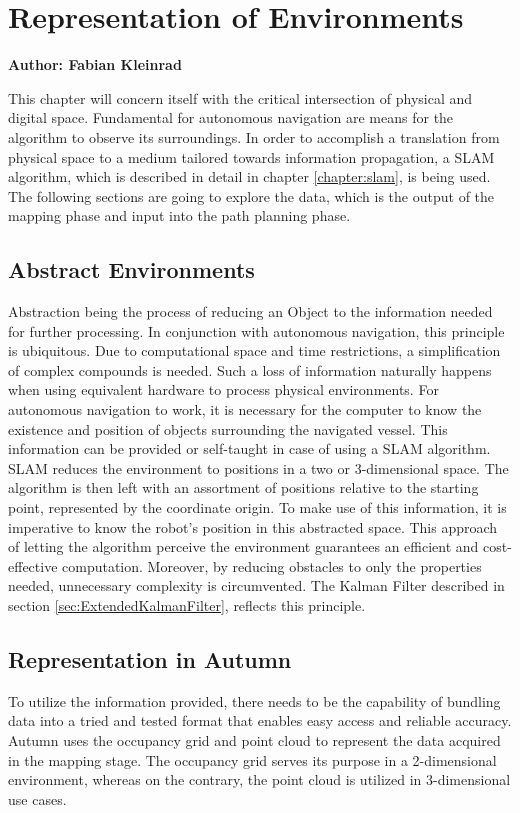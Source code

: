 \chapter{Representation of Environments}
\label{chapter:abstract_env}

\textbf{Author: Fabian Kleinrad} 

This chapter will concern itself with the critical intersection of physical and digital space. Fundamental for autonomous navigation are means for the algorithm to observe its surroundings. In order to accomplish a translation from physical space to a medium tailored towards information propagation, a SLAM algorithm, which is described in detail in chapter \ref{chapter:slam}, is being used. The following sections are going to explore the data, which is the output of the mapping phase and input into the path planning phase.

\section{Abstract Environments}

Abstraction being the process of reducing an Object to the information needed for further processing. In conjunction with autonomous navigation, this principle is ubiquitous. Due to computational space and time restrictions, a simplification of complex compounds is needed. Such a loss of information naturally happens when using equivalent hardware to process physical environments.\newline
For autonomous navigation to work, it is necessary for the computer to know the existence and position of objects surrounding the navigated vessel. This information can be provided or self-taught in case of using a SLAM algorithm. SLAM reduces the environment to positions in a two or 3-dimensional space. The algorithm is then left with an assortment of positions relative to the starting point, represented by the coordinate origin. To make use of this information, it is imperative to know the robot's position in this abstracted space.\newline
This approach of letting the algorithm perceive the environment guarantees an efficient and cost-effective computation. Moreover, by reducing obstacles to only the properties needed, unnecessary complexity is circumvented.      
The Kalman Filter described in section \ref{sec:ExtendedKalmanFilter}, reflects this principle.

\section{Representation in Autumn}
To utilize the information provided, there needs to be the capability of bundling data into a tried and tested format that enables easy access and reliable accuracy.\newline
Autumn uses the occupancy grid and point cloud to represent the data acquired in the mapping stage. The occupancy grid serves its purpose in a 2-dimensional environment, whereas on the contrary, the point cloud is utilized in 3-dimensional use cases.

